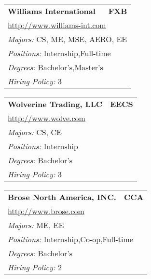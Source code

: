 \documentclass[twoside]{article}
\begin{document}
\begin{center}
\begin{multicols}{3}
\begin{FlushLeft}
\begin{minipage}{.9\columnwidth}
\end{minipage}
 
\begin{minipage}{.9\columnwidth}\begin{tabularx}{.95\columnwidth}{Xr}
                 {\Large\bf Williams International} & {\Large\bf FXB}\\
    \multicolumn{2}{p{.95\columnwidth}}{\url{http://www.williams-int.com}}\\
    \multicolumn{2}{p{.95\columnwidth}}{\emph{Majors:} CS, ME, MSE, AERO, EE}\\
    \multicolumn{2}{p{.95\columnwidth}}{\emph{Positions:} Internship,Full-time}\\
    \multicolumn{2}{p{.95\columnwidth}}{\emph{Degrees:} Bachelor's,Master's}\\
    \multicolumn{2}{p{.95\columnwidth}}{\emph{Hiring Policy:} 3}\\
    \end{tabularx}
    
\end{minipage}
 
\begin{minipage}{.9\columnwidth}\begin{tabularx}{.95\columnwidth}{Xr}
                 {\Large\bf Wolverine Trading, LLC} & {\Large\bf EECS}\\
    \multicolumn{2}{p{.95\columnwidth}}{\url{http://www.wolve.com}}\\
    \multicolumn{2}{p{.95\columnwidth}}{\emph{Majors:} CS, CE}\\
    \multicolumn{2}{p{.95\columnwidth}}{\emph{Positions:} Internship}\\
    \multicolumn{2}{p{.95\columnwidth}}{\emph{Degrees:} Bachelor's}\\
    \multicolumn{2}{p{.95\columnwidth}}{\emph{Hiring Policy:} 3}\\
    \end{tabularx}
    
\end{minipage}
 
\begin{minipage}{.9\columnwidth}\begin{tabularx}{.95\columnwidth}{Xr}
                 {\Large\bf Brose North America, INC.} & {\Large\bf CCA}\\
    \multicolumn{2}{p{.95\columnwidth}}{\url{http://www.brose.com}}\\
    \multicolumn{2}{p{.95\columnwidth}}{\emph{Majors:} ME, EE}\\
    \multicolumn{2}{p{.95\columnwidth}}{\emph{Positions:} Internship,Co-op,Full-time}\\
    \multicolumn{2}{p{.95\columnwidth}}{\emph{Degrees:} Bachelor's}\\
    \multicolumn{2}{p{.95\columnwidth}}{\emph{Hiring Policy:} 2}\\
    \end{tabularx}
    

\end{minipage}
\end{FlushLeft}
\end{multicols}
\end{center}
\end{document}
